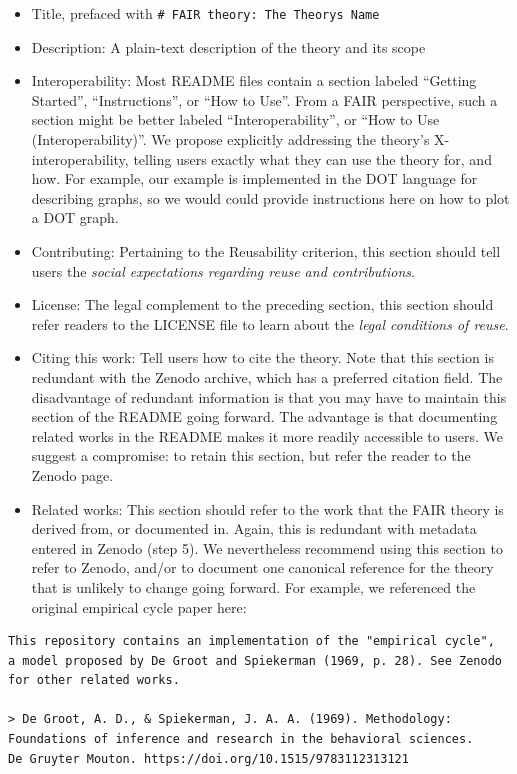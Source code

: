 \documentclass[
  man,floatsintext]{apa6}
\providecommand{\tightlist}{%
  \setlength{\itemsep}{0pt}\setlength{\parskip}{0pt}}
\begin{document}
\begin{itemize}
\tightlist
\item
  Title, prefaced with \texttt{\#\ FAIR\ theory:\ The\ Theory\textquotesingle{}s\ Name}
\item
  Description: A plain-text description of the theory and its scope
\item
  Interoperability: Most README files contain a section labeled ``Getting Started'', ``Instructions'', or ``How to Use''. From a FAIR perspective, such a section might be better labeled ``Interoperability'', or ``How to Use (Interoperability)''. We propose explicitly addressing the theory's X-interoperability, telling users exactly what they can use the theory for, and how. For example, our example is implemented in the DOT language for describing graphs, so we would could provide instructions here on how to plot a DOT graph.
\item
  Contributing: Pertaining to the Reusability criterion, this section should tell users the \emph{social expectations regarding reuse and contributions}.
\item
  License: The legal complement to the preceding section, this section should refer readers to the LICENSE file to learn about the \emph{legal conditions of reuse}.
\item
  Citing this work: Tell users how to cite the theory. Note that this section is redundant with the Zenodo archive, which has a preferred citation field. The disadvantage of redundant information is that you may have to maintain this section of the README going forward. The advantage is that documenting related works in the README makes it more readily accessible to users. We suggest a compromise: to retain this section, but refer the reader to the Zenodo page.
\item
  Related works: This section should refer to the work that the FAIR theory is derived from, or documented in. Again, this is redundant with metadata entered in Zenodo (step 5). We nevertheless recommend using this section to refer to Zenodo, and/or to document one canonical reference for the theory that is unlikely to change going forward. For example, we referenced the original empirical cycle paper here:
\end{itemize}

\begin{verbatim}
This repository contains an implementation of the "empirical cycle",
a model proposed by De Groot and Spiekerman (1969, p. 28). See Zenodo for other related works.

> De Groot, A. D., & Spiekerman, J. A. A. (1969). Methodology:
Foundations of inference and research in the behavioral sciences.
De Gruyter Mouton. https://doi.org/10.1515/9783112313121
\end{verbatim}
\end{document}
